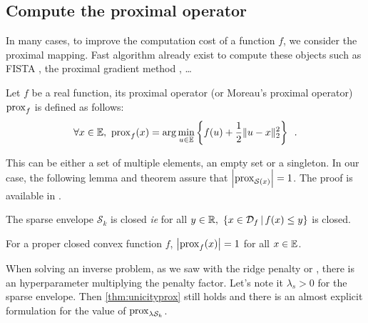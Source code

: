 
\subsection{Compute the proximal operator}

In many cases, to improve the computation cost of a function $f$, we consider the proximal mapping. Fast algorithm already exist to compute these objects such as FISTA \cite{beck2009fast}, the proximal gradient method \cite{ryu2017proximal}, \dots

\begin{definition}\label{def:prox}
Let $f$ be a real function, its proximal operator (or Moreau's proximal operator) $\operatorname{prox}_f$ is defined as follows:
\[\forall x\in\mathbb{E},\ \operatorname{prox}_f(x) =\arg\min_{u\in \mathbb{E}}\left\{f(u) + \frac{1}{2}\|u-x\|^2_2\right\}\enspace.\] 
\end{definition}

This can be either a set of multiple elements, an empty set or a singleton. In our case, the following lemma and theorem assure that $\left|\operatorname{prox}_{\mathcal{S}(x)}\right| = 1$. The proof is available in \cite{beck}.

\begin{lemma}
The sparse envelope $\mathcal{S}_k$ is closed \emph{ie} for all $y \in \RR,\ \left\{x\in \mathcal{D}_f\, |\, f(x)\leq y\right\}$ is closed.
\end{lemma}
\begin{theorem}\label{thm:unicityprox}
For a proper closed convex function $f$, $\left|\operatorname{prox}_f(x)\right| = 1$ for all $x\in\mathbb{E}$.
\end{theorem}

When solving an inverse problem, as we saw with the ridge penalty or \enet, there is an hyperparameter multiplying the penalty factor. Let's note it $\lambda_s>0$ for the sparse envelope. Then \ref{thm:unicityprox} still holds and there is an almost explicit formulation for the value of $\operatorname{prox}_{\lambda\mathcal{S}_k}$.

